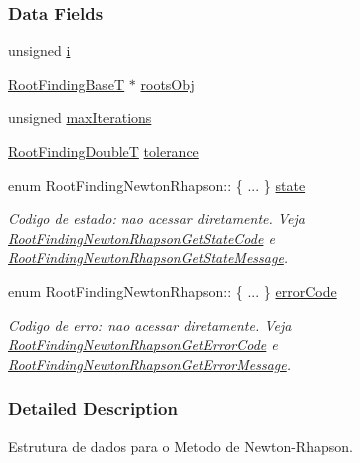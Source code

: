 \subsubsection*{Data Fields}
\begin{CompactItemize}
\item 
unsigned \hyperlink{structRootFindingNewtonRhapson_3308e933e977d0303aca70f073cb6338}{i}
\item 
\hyperlink{structRootFindingBase}{RootFindingBaseT} $\ast$ \hyperlink{structRootFindingNewtonRhapson_70f35799dc3717d1c54e4ba3f6699bd0}{rootsObj}
\item 
unsigned \hyperlink{structRootFindingNewtonRhapson_931d9fbff24e1dd9535e3060470a9873}{maxIterations}
\item 
\hyperlink{RootFindingCommon_8h_a296fe63994e03408c4ad62794d472e9}{RootFindingDoubleT} \hyperlink{structRootFindingNewtonRhapson_d08bd3b49a28267b55f91b38fecef4b6}{tolerance}
\item 
enum RootFindingNewtonRhapson:: \{ ... \}  \hyperlink{structRootFindingNewtonRhapson_de6c150e9d8a98e8a097f1002094fc90}{state}
\begin{CompactList}\small\item\em Codigo de estado: nao acessar diretamente. Veja \hyperlink{group____newton_g9d87a4beccc7b61365f6b680fc1a4355}{RootFindingNewtonRhapsonGetStateCode} e \hyperlink{group____newton_g70436f650ac07866bb8d9897908f4422}{RootFindingNewtonRhapsonGetStateMessage}. \item\end{CompactList}\item 
enum RootFindingNewtonRhapson:: \{ ... \}  \hyperlink{structRootFindingNewtonRhapson_b35a21e9345d1da0984870793a883ff9}{errorCode}
\begin{CompactList}\small\item\em Codigo de erro: nao acessar diretamente. Veja \hyperlink{group____newton_ga8599365ab3f0770158719cdd32eb5c3}{RootFindingNewtonRhapsonGetErrorCode} e \hyperlink{group____newton_gcbbd94963ebd3ddbaf6bf4e9ce1c0a1f}{RootFindingNewtonRhapsonGetErrorMessage}. \item\end{CompactList}\end{CompactItemize}


\subsubsection{Detailed Description}
Estrutura de dados para o Metodo de Newton-Rhapson. 

